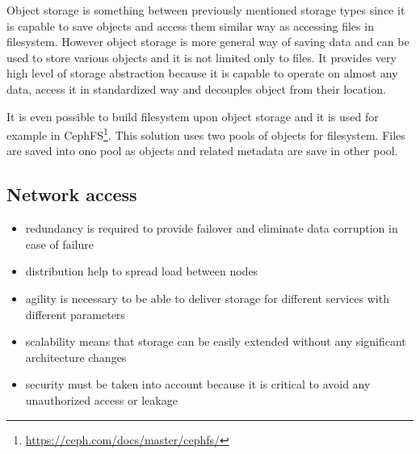 Object storage is something between previously mentioned storage types since it is capable to save objects and access them similar way as accessing files in filesystem. However object storage is more general way of saving data and can be used to store various objects and it is not limited only to files. It provides very high level of storage abstraction because it is capable to operate on almost any data, access it in standardized way and decouples object from their location.

It is even possible to build filesystem upon object storage and it is used for example in CephFS\footnote{\url{https://ceph.com/docs/master/cephfs/}}. This solution uses two pools of objects for  filesystem. Files are saved into ono pool as objects and related metadata are save in other pool. 

\subsection{Network access}



\begin{itemize}
	\item redundancy is required to provide failover and eliminate data corruption in case of failure 
	\item distribution help to spread load between nodes
	\item agility is necessary to be able to deliver storage for different services with different parameters
	\item scalability means that storage can be easily extended without any significant architecture changes
	\item security must be taken into account because it is critical to avoid any unauthorized access or leakage
\end{itemize}

% 






